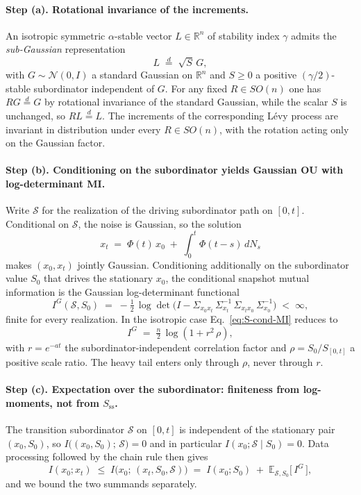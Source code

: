 \documentclass[%
 reprint,
 superscriptaddress,
 nofootinbib,
 nobibnotes,
 amsmath,amssymb,
 aps,
 prl,
 floatfix,
]{revtex4-2}
\newcommand{\Sss}{S_{\mathrm{ss}}}
\newcommand{\RR}{\mathbb{R}}
\newcommand{\E}{\mathbb{E}}
\begin{document}
\paragraph{Step (a). Rotational invariance of the increments.}
An isotropic symmetric $\alpha$-stable vector $L \in \RR^n$ of stability index $\gamma$ admits the \emph{sub-Gaussian} representation~\cite{SamorodnitskyTaqqu1994}
\begin{equation}\label{eq:S-subGauss}
L \;\stackrel{d}{=}\; \sqrt{S}\,G,
\end{equation}
with $G \sim \mathcal N(0, I)$ a standard Gaussian on $\RR^n$ and $S \ge 0$ a positive $(\gamma/2)$-stable subordinator independent of $G$. For any fixed $R \in SO(n)$ one has $R G \stackrel{d}{=} G$ by rotational invariance of the standard Gaussian, while the scalar $S$ is unchanged, so $R L \stackrel{d}{=} L$. The increments of the corresponding L\'evy process are invariant in distribution under every $R \in SO(n)$, with the rotation acting only on the Gaussian factor.

\paragraph{Step (b). Conditioning on the subordinator yields Gaussian OU with log-determinant MI.}
Write $\mathcal S$ for the realization of the driving subordinator path on $[0, t]$. Conditional on $\mathcal S$, the noise is Gaussian, so the solution
\[
x_t \;=\; \Phi(t)\,x_0 \;+\; \int_0^t \Phi(t - s)\,dN_s
\]
makes $(x_0, x_t)$ jointly Gaussian. Conditioning additionally on the subordinator value $S_0$ that drives the stationary $x_0$, the conditional snapshot mutual information is the Gaussian log-determinant functional
\begin{equation}\label{eq:S-cond-MI}
I^{G}(\mathcal S, S_0) \;=\; -\tfrac{1}{2}\,\log\det\bigl(I - \Sigma_{x_0 x_t}\,\Sigma_{x_t}^{-1}\,\Sigma_{x_t x_0}\,\Sigma_{x_0}^{-1}\bigr) \;<\; \infty,
\end{equation}
finite for every realization. In the isotropic case Eq.~\eqref{eq:S-cond-MI} reduces to
\[
I^{G} \;=\; \tfrac{n}{2}\,\log(1 + r^2\,\rho),
\]
with $r = e^{-a t}$ the subordinator-independent correlation factor and $\rho = S_0 / S_{[0,t]}$ a positive scale ratio. The heavy tail enters only through $\rho$, never through $r$.

\paragraph{Step (c). Expectation over the subordinator: finiteness from log-moments, not from $\Sss$.}
The transition subordinator $\mathcal S$ on $[0, t]$ is independent of the stationary pair $(x_0, S_0)$, so $I\bigl((x_0, S_0);\,\mathcal S\bigr) = 0$ and in particular $I(x_0; \mathcal S \mid S_0) = 0$. Data processing followed by the chain rule then gives
\begin{equation}\label{eq:S-finiteness-chain}
I(x_0; x_t) \;\le\; I\bigl(x_0;\, (x_t, S_0, \mathcal S)\bigr) \;=\; I(x_0; S_0) \;+\; \E_{\mathcal S, S_0}\bigl[\,I^{G}\,\bigr],
\end{equation}
and we bound the two summands separately.
\end{document}
